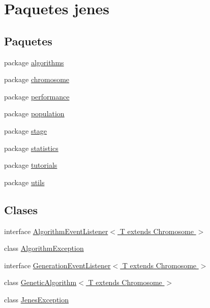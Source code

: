 \hypertarget{namespacejenes}{\section{Paquetes jenes}
\label{namespacejenes}
}
\subsection*{Paquetes}
\begin{DoxyCompactItemize}
\item 
package \hyperlink{namespacejenes_1_1algorithms}{algorithms}
\item 
package \hyperlink{namespacejenes_1_1chromosome}{chromosome}
\item 
package \hyperlink{namespacejenes_1_1performance}{performance}
\item 
package \hyperlink{namespacejenes_1_1population}{population}
\item 
package \hyperlink{namespacejenes_1_1stage}{stage}
\item 
package \hyperlink{namespacejenes_1_1statistics}{statistics}
\item 
package \hyperlink{namespacejenes_1_1tutorials}{tutorials}
\item 
package \hyperlink{namespacejenes_1_1utils}{utils}
\end{DoxyCompactItemize}
\subsection*{Clases}
\begin{DoxyCompactItemize}
\item 
interface \hyperlink{interfacejenes_1_1_algorithm_event_listener_3_01_t_01extends_01_chromosome_01_4}{Algorithm\-Event\-Listener$<$ T extends Chromosome $>$}
\item 
class \hyperlink{classjenes_1_1_algorithm_exception}{Algorithm\-Exception}
\item 
interface \hyperlink{interfacejenes_1_1_generation_event_listener_3_01_t_01extends_01_chromosome_01_4}{Generation\-Event\-Listener$<$ T extends Chromosome $>$}
\item 
class \hyperlink{classjenes_1_1_genetic_algorithm_3_01_t_01extends_01_chromosome_01_4}{Genetic\-Algorithm$<$ T extends Chromosome $>$}
\item 
class \hyperlink{classjenes_1_1_jenes_exception}{Jenes\-Exception}
\end{DoxyCompactItemize}

